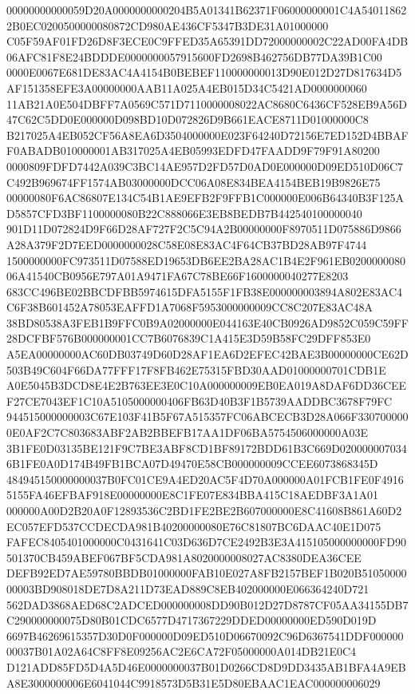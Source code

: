 \documentclass[UTF8,fontset=fandol,zihao=-4,a4paper]{ctexart}
\begin{document}
{{00000000000059D20A0000000000204B5A01341B62371F06000000001C4A540118622B0EC0200500000080872CD980AE436CF5347B3DE31A01000000
C05F59AF01FD26D8F3ECE0C9FFED35A65391DD72000000002C22AD00FA4DB06AFC81F8E24BDDDE0000000057915600FD2698B462756DB77DA39B1C00
0000E0067E681DE83AC4A4154B0BEBEF110000000013D90E012D27D817634D5AF151358EFE3A00000000AAB11A025A4EB015D34C5421AD0000000060
11AB21A0E504DBFF7A0569C571D7110000008022AC8680C6436CF528EB9A56D47C62C5DD0E000000D098BD10D072826D9B661EACE8711D01000000C8
B217025A4EB052CF56A8EA6D3504000000E023F64240D72156E7ED152D4BBAFF0ABADB010000001AB317025A4EB05993EDFD47FAADD9F79F91A80200
0000809FDFD7442A039C3BC14AE957D2FD57D0AD0E000000D09ED510D06C7C492B969674FF1574AB03000000DCC06A08E834BEA4154BEB19B9826E75
00000080F6AC86807E134C54B1AE9EFB2F9FFB1C000000E006B64340B3F125AD5857CFD3BF1100000080B22C888066E3EB8BEDB7B442540100000040
901D11D072824D9F66D28AF727F2C5C94A2B00000000F8970511D075886D9866A28A379F2D7EED0000000028C58E08E83AC4F64CB37BD28AB97F4744
1500000000FC973511D07588ED19653DB6EE2BA28AC1B4E2F961EB020000008006A41540CB0956E797A01A9471FA67C78BE66F1600000040277E8203
683CC496BE02BBCDFBB5974615DFA5155F1FB38E000000003894A802E83AC4C6F38B601452A78053EAFFD1A7068F5953000000009CC8C207E83AC48A
38BD80538A3FEB1B9FFC0B9A02000000E044163E40CB0926AD9852C059C59FF28DCFBF576B000000001CC7B6076839C1A415E3D59B58FC29DFF853E0
A5EA00000000AC60DB03749D60D28AF1EA6D2EFEC42BAE3B00000000CE62D503B49C604F66DA77FFF17F8FB462E75315FBD30AAD01000000701CDB1E
A0E5045B3DCD8E4E2B763EE3E0C10A000000009EB0EA019A8DAF6DD36CEEF27CE7043EF1C10A5105000000406FB63D40B3F1B5739AADDBC3678F79FC
944515000000003C67E103F41B5F67A515357FC06ABCECB3D28A066F3307000000E0AF2C7C803683ABF2AB2BBEFB17AA1DF06BA5754506000000A03E
3B1FE0D03135BE121F9C7BE3ABF8CD1BF89172BDD61B3C669D0200000070346B1FE0A0D174B49FB1BCA07D49470E58CB000000009CCEE6073868345D
484945150000000037B0FC01CE9A4ED20AC5F4D70A000000A01FCB1FE0F49165155FA46EFBAF918E00000000E8C1FE07E834BBA415C18AEDBF3A1A01
000000A00D2B20A0F12893536C2BD1FE2BE2B607000000E8C41608B861A60D2EC057EFD537CCDECDA981B40200000080E76C81807BC6DAAC40E1D075
FAFEC8405401000000C0431641C03D636D7CE2492B3E3A415105000000000FD90501370CB459ABEF067BF5CDA981A8020000008027AC8380DEA36CEE
DEFB92ED7AE59780BBDB01000000FAB10E027A8FB2157BEF1B020B5105000000003BD908018DE7D8A211D73EAD889C8EB402000000E066364240D721
562DAD3868AED68C2ADCED000000008DD90B012D27D8787CF05AA34155DB7C290000000075D80B01CDC6577D4717367229DDED00000000ED590D019D
6697B46269615357D30D0F000000D09ED510D06670092C96D6367541DDF00000000037B01A02A64C8FF8E09256AC2E6CA72F05000000A014DB21E0C4
D121ADD85FD5D4A5D46E0000000037B01D0266CD8D9DD3435AB1BFA4A9EBA8E3000000006E6041044C9918573D5B31E5D80EBAAC1EAC000000006029
}}
\end{document}

